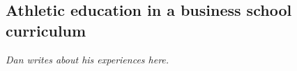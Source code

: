 \subsection{Athletic education in a business school curriculum}

{\em Dan writes about his experiences here.}